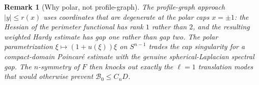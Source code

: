 \documentclass[11pt]{article}
\newtheorem{remark}[theorem]{Remark}
\newcommand{\B}{\mathcal{B}}
\begin{document}
\begin{remark}[Why polar, not profile-graph]
The profile-graph approach $|y|\le r(x)$ uses coordinates that are degenerate at the polar caps $x=\pm 1$: the Hessian of the perimeter functional has rank $1$ rather than $2$, and the resulting weighted Hardy estimate has gap one rather than gap two. The polar parametrization $\xi\mapsto (1+u(\xi))\xi$ on $S^{n-1}$ trades the cap singularity for a compact-domain Poincar\'e estimate with the genuine spherical-Laplacian spectral gap. The $n$-symmetry of $F$ then knocks out exactly the $\ell=1$ translation modes that would otherwise prevent $\B_0 \le C_n D$.
\end{remark}
\end{document}
